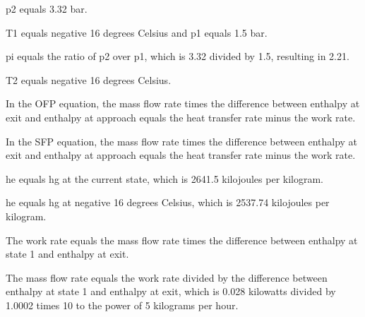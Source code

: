 p2 equals 3.32 bar.

T1 equals negative 16 degrees Celsius and p1 equals 1.5 bar.

pi equals the ratio of p2 over p1, which is 3.32 divided by 1.5, resulting in 2.21.

T2 equals negative 16 degrees Celsius.

In the OFP equation, the mass flow rate times the difference between enthalpy at exit and enthalpy at approach equals the heat transfer rate minus the work rate.

In the SFP equation, the mass flow rate times the difference between enthalpy at exit and enthalpy at approach equals the heat transfer rate minus the work rate.

he equals hg at the current state, which is 2641.5 kilojoules per kilogram.

he equals hg at negative 16 degrees Celsius, which is 2537.74 kilojoules per kilogram.

The work rate equals the mass flow rate times the difference between enthalpy at state 1 and enthalpy at exit.

The mass flow rate equals the work rate divided by the difference between enthalpy at state 1 and enthalpy at exit, which is 0.028 kilowatts divided by 1.0002 times 10 to the power of 5 kilograms per hour.